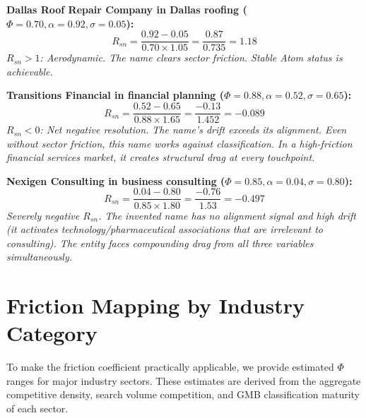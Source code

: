 \documentclass[12pt, openany]{book}
\theoremstyle{thmstyle}
\theoremstyle{defstyle}
\begin{document}
\begin{calcbox}
\textbf{Dallas Roof Repair Company in Dallas roofing ($\Phi = 0.70, \alpha = 0.92, \sigma = 0.05$):}
\[
R_{sn} = \frac{0.92 - 0.05}{0.70 \times 1.05} = \frac{0.87}{0.735} = 1.18
\]
\textit{$R_{sn} > 1$: Aerodynamic. The name clears sector friction. Stable Atom status is achievable.}

\vspace{8pt}
\textbf{Transitions Financial in financial planning ($\Phi = 0.88, \alpha = 0.52, \sigma = 0.65$):}
\[
R_{sn} = \frac{0.52 - 0.65}{0.88 \times 1.65} = \frac{-0.13}{1.452} = -0.089
\]
\textit{$R_{sn} < 0$: Net negative resolution. The name's drift exceeds its alignment. Even without sector friction, this name works against classification. In a high-friction financial services market, it creates structural drag at every touchpoint.}

\vspace{8pt}
\textbf{Nexigen Consulting in business consulting ($\Phi = 0.85, \alpha = 0.04, \sigma = 0.80$):}
\[
R_{sn} = \frac{0.04 - 0.80}{0.85 \times 1.80} = \frac{-0.76}{1.53} = -0.497
\]
\textit{Severely negative $R_{sn}$. The invented name has no alignment signal and high drift (it activates technology/pharmaceutical associations that are irrelevant to consulting). The entity faces compounding drag from all three variables simultaneously.}
\end{calcbox}

\section{Friction Mapping by Industry Category}

To make the friction coefficient practically applicable, we provide estimated $\Phi$ ranges for major industry sectors. These estimates are derived from the aggregate competitive density, search volume competition, and GMB classification maturity of each sector.
\end{document}
